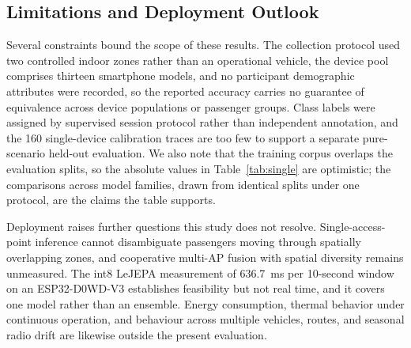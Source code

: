 \subsection{Limitations and Deployment Outlook}

Several constraints bound the scope of these results. The collection protocol used two controlled indoor zones rather than an operational vehicle, the device pool comprises thirteen smartphone models, and no participant demographic attributes were recorded, so the reported accuracy carries no guarantee of equivalence across device populations or passenger groups. Class labels were assigned by supervised session protocol rather than independent annotation, and the 160 single-device calibration traces are too few to support a separate pure-scenario held-out evaluation. We also note that the training corpus overlaps the evaluation splits, so the absolute values in Table~\ref{tab:single} are optimistic; the comparisons across model families, drawn from identical splits under one protocol, are the claims the table supports.

Deployment raises further questions this study does not resolve. Single-access-point inference cannot disambiguate passengers moving through spatially overlapping zones, and cooperative multi-AP fusion with spatial diversity remains unmeasured. The int8 LeJEPA measurement of 636.7~ms per 10-second window on an ESP32-D0WD-V3 establishes feasibility but not real time, and it covers one model rather than an ensemble. Energy consumption, thermal behavior under continuous operation, and behaviour across multiple vehicles, routes, and seasonal radio drift are likewise outside the present evaluation.
